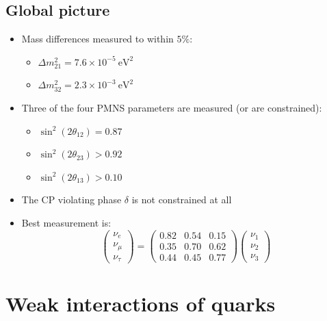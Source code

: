 \documentclass[11pt]{article}
\newcommand{\ev}{\text{eV}}
\begin{document}
\subsection{Global picture}
\begin{itemize}
  \item Mass differences measured to within $5\%$:
  \begin{itemize}
    \item $\Delta m_{21}^2 = 7.6 \times 10^{-5}~\ev^2$
    \item $\Delta m_{32}^2 = 2.3 \times 10^{-3}~\ev^2$
  \end{itemize}
  \item Three of the four PMNS parameters are measured (or are constrained):
  \begin{itemize}
    \item $\sin^2(2\theta_{12}) = 0.87$
    \item $\sin^2(2\theta_{23}) > 0.92$
    \item $\sin^2(2\theta_{13}) > 0.10$
  \end{itemize}
  \item The CP violating phase $\delta$ is not constrained at all
  \item Best measurement is:
  \begin{equation}
    \begin{pmatrix} \nu_e \\ \nu_\mu \\ \nu_\tau \end{pmatrix} = \begin{pmatrix} 0.82 & 0.54 & 0.15 \\ 0.35 & 0.70 & 0.62 \\ 0.44 & 0.45 & 0.77 \end{pmatrix}\begin{pmatrix} \nu_1 \\ \nu_2 \\ \nu_3 \end{pmatrix}
  \end{equation}
\end{itemize}

\section{Weak interactions of quarks}
\end{document}

